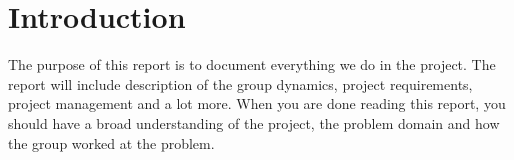 \section{Introduction}
The purpose of this report is to document everything we do in the project. The report will include description of the group dynamics, project requirements, project management and a lot more. When you are done reading this report, you should have a broad understanding of the project, the problem domain and how the group worked at the problem.


